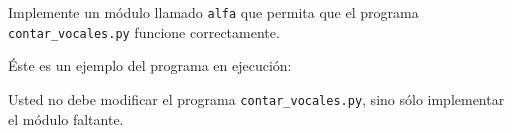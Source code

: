 Implemente un módulo llamado \texttt{alfa}
que permita que el programa \verb+contar_vocales.py+
funcione correctamente.

Éste es un ejemplo del programa en ejecución:

\begin{minipage}[t]{.60\textwidth}
  
\end{minipage}

Usted no debe modificar el programa \verb+contar_vocales.py+,
sino sólo implementar el módulo faltante.

